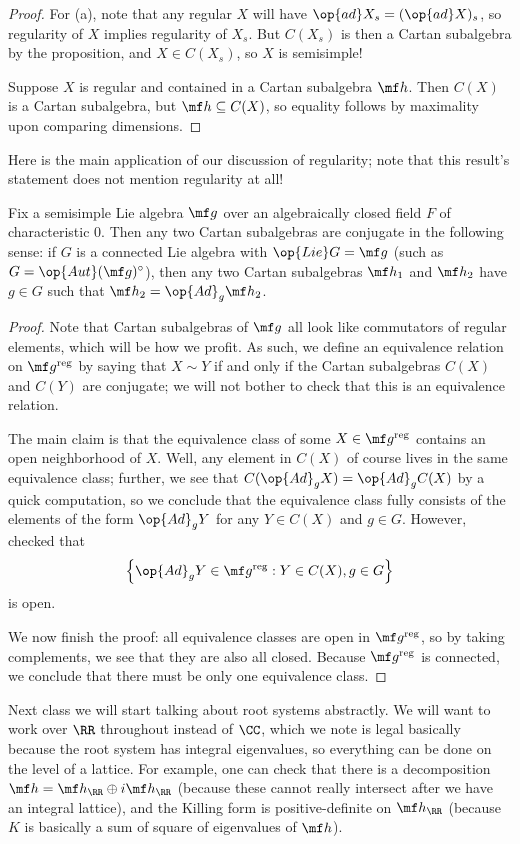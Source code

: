 \documentclass[../notes.tex]{subfiles}
\begin{document}
\begin{proof}
	For (a), note that any regular $X$ will have $\op{ad}X_s=(\op{ad}X)_s$, so regularity of $X$ implies regularity of $X_s$. But $C(X_s)$ is then a Cartan subalgebra by the proposition, and $X\in C(X_s)$, so $X$ is semisimple!

	Suppose $X$ is regular and contained in a Cartan subalgebra $\mf h$. Then $C(X)$ is a Cartan subalgebra, but $\mf h\subseteq C(X)$, so equality follows by maximality upon comparing dimensions.
\end{proof}
Here is the main application of our discussion of regularity; note that this result's statement does not mention regularity at all!
\begin{theorem}
	Fix a semisimple Lie algebra $\mf g$ over an algebraically closed field $F$ of characteristic $0$. Then any two Cartan subalgebras are conjugate in the following sense: if $G$ is a connected Lie algebra with $\op{Lie}G=\mf g$ (such as $G=\op{Aut}(\mf g)^\circ$), then any two Cartan subalgebras $\mf h_1$ and $\mf h_2$ have $g\in G$ such that $\mf h_2=\op{Ad}_g\mf h_2$.
\end{theorem}
\begin{proof}
	Note that Cartan subalgebras of $\mf g$ all look like commutators of regular elements, which will be how we profit. As such, we define an equivalence relation on $\mf g^{\mathrm{reg}}$ by saying that $X\sim Y$ if and only if the Cartan subalgebras $C(X)$ and $C(Y)$ are conjugate; we will not bother to check that this is an equivalence relation.

	The main claim is that the equivalence class of some $X\in\mf g^{\mathrm{reg}}$ contains an open neighborhood of $X$. Well, any element in $C(X)$ of course lives in the same equivalence class; further, we see that $C(\op{Ad}_gX)=\op{Ad}_gC(X)$ by a quick computation, so we conclude that the equivalence class fully consists of the elements of the form $\op{Ad}_gY$ for any $Y\in C(X)$ and $g\in G$. However,  checked that
	\[\left\{\op{Ad}_gY\in\mf g^{\mathrm{reg}}:Y\in C(X),g\in G\right\}\]
	is open.

	We now finish the proof: all equivalence classes are open in $\mf g^{\mathrm{reg}}$, so by taking complements, we see that they are also all closed. Because $\mf g^{\mathrm{reg}}$ is connected, we conclude that there must be only one equivalence class.
\end{proof}
\begin{remark}
	Next class we will start talking about root systems abstractly. We will want to work over $\RR$ throughout instead of $\CC$, which we note is legal basically because the root system has integral eigenvalues, so everything can be done on the level of a lattice. For example, one can check that there is a decomposition $\mf h=\mf h_\RR\oplus i\mf h_\RR$ (because these cannot really intersect after we have an integral lattice), and the Killing form is positive-definite on $\mf h_\RR$ (because $K$ is basically a sum of square of eigenvalues of $\mf h$).
\end{remark}
\end{document}
